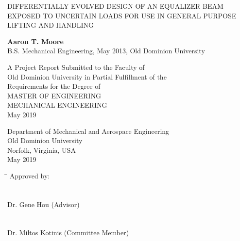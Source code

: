 \begin{titlepage}
   \begin{center}
       \vspace*{1cm}
       
       \Large
	   {\uppercase{{Differentially Evolved Design of an Equalizer Beam Exposed to Uncertain Loads for use in General Purpose Lifting and Handling}}\par}
       \normalsize

       \vspace{2.5cm}
 
       \textbf{Aaron T. Moore}\\
       B.S. Mechanical Engineering, May 2013, Old Dominion University
 
       \vfill
 
       A Project Report Submitted to the Faculty of\\
       Old Dominion University in Partial Fulfillment of the\\
       Requirements for the Degree of\\
       \vspace{1.0cm}
       \uppercase{Master of Engineering}\\
       \vspace{1em}
       \uppercase{Mechanical Engineering}\\
       \vspace{1em}
       {May 2019}\\

 
       \vspace{0.8cm}
 
 
       Department of Mechanical  and Aerospace Engineering\\
       Old Dominion University\\
       Norfolk, Virginia, USA\\
       May 2019
 
   \end{center}
   \vspace{1cm}
   \begin{tabbing}
      \hspace*{11cm}\= \kill
      \>Approved by:\\
      \\
      \>\vspace{2cm}\makebox[6.25cm]{\hrulefill}\\
      \>Dr. Gene Hou (Advisor)\\
      \\
      \>\vspace{2cm}\makebox[6.25cm]{\hrulefill}\\
      \>Dr. Miltos Kotinis (Committee Member)
   \end{tabbing}
\end{titlepage}
